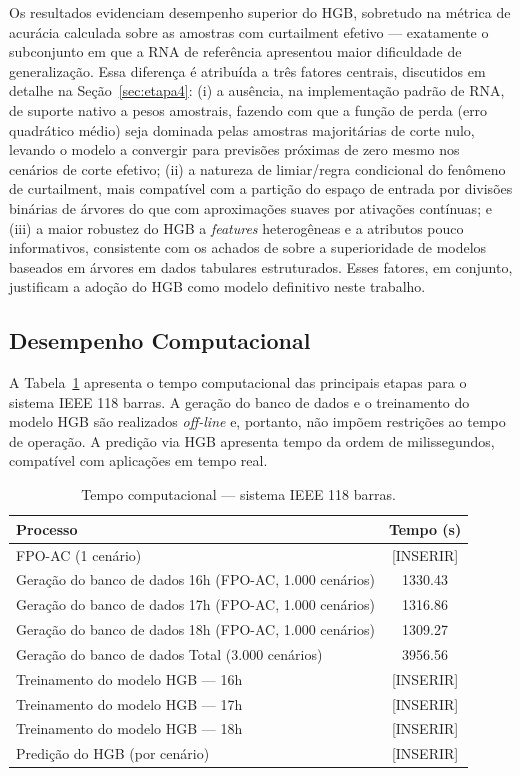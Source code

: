 \documentclass[conference]{IEEEtran}
\begin{document}
Os resultados evidenciam desempenho superior do HGB, sobretudo na métrica
de acurácia calculada sobre as amostras com curtailment efetivo — exatamente
o subconjunto em que a RNA de referência apresentou maior dificuldade de
generalização. Essa diferença é atribuída a três fatores centrais,
discutidos em detalhe na Seção~\ref{sec:etapa4}: (i) a ausência, na
implementação padrão de RNA, de suporte nativo a pesos amostrais,
fazendo com que a função de perda (erro quadrático médio) seja dominada
pelas amostras majoritárias de corte nulo, levando o modelo a convergir
para previsões próximas de zero mesmo nos cenários de corte efetivo; (ii)
a natureza de limiar/regra condicional do fenômeno de curtailment, mais
compatível com a partição do espaço de entrada por divisões binárias de
árvores do que com aproximações suaves por ativações contínuas; e (iii)
a maior robustez do HGB a \textit{features} heterogêneas e a atributos
pouco informativos, consistente com os achados de
\cite{grinsztajn2022tree} sobre a superioridade de modelos baseados em
árvores em dados tabulares estruturados. Esses fatores, em conjunto,
justificam a adoção do HGB como modelo definitivo neste trabalho.

\subsection{Desempenho Computacional}

A Tabela~\ref{tab:tempo} apresenta o tempo computacional das principais
etapas para o sistema IEEE 118 barras. A geração do banco de dados e o
treinamento do modelo HGB são realizados \textit{off-line} e, portanto, não
impõem restrições ao tempo de operação. A predição via HGB apresenta
tempo da ordem de milissegundos, compatível com aplicações em tempo real.

\begin{table}[H]
\centering
\caption{Tempo computacional — sistema IEEE 118 barras.}
\label{tab:tempo}
\begin{tabular}{lc}
\hline
\textbf{Processo} & \textbf{Tempo (s)} \\
\hline
FPO-AC (1 cenário) & [INSERIR] \\
Geração do banco de dados 16h (FPO-AC, 1.000 cenários) &  1330.43 \\
Geração do banco de dados 17h (FPO-AC, 1.000 cenários) &  1316.86  \\
Geração do banco de dados 18h (FPO-AC, 1.000 cenários) &  1309.27 \\
Geração do banco de dados Total (3.000 cenários)       &  3956.56 \\
Treinamento do modelo HGB — 16h                        & [INSERIR] \\
Treinamento do modelo HGB — 17h                        & [INSERIR] \\
Treinamento do modelo HGB — 18h                        & [INSERIR] \\
Predição do HGB (por cenário)                          & [INSERIR] \\
\hline
\end{tabular}
\end{table}
\end{document}
